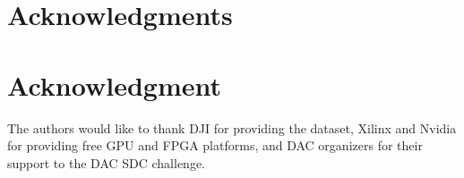 \documentclass[10pt,journal,compsoc]{IEEEtran}
\begin{document}



\ifCLASSOPTIONcompsoc
  \section*{Acknowledgments}
\else
  \section*{Acknowledgment}
\fi


The authors would like to thank DJI for providing the dataset, Xilinx and Nvidia for providing free GPU and FPGA platforms, and DAC organizers for their support to the DAC SDC challenge.


\ifCLASSOPTIONcaptionsoff
  \newpage
\fi





%
%
%
\end{document}
